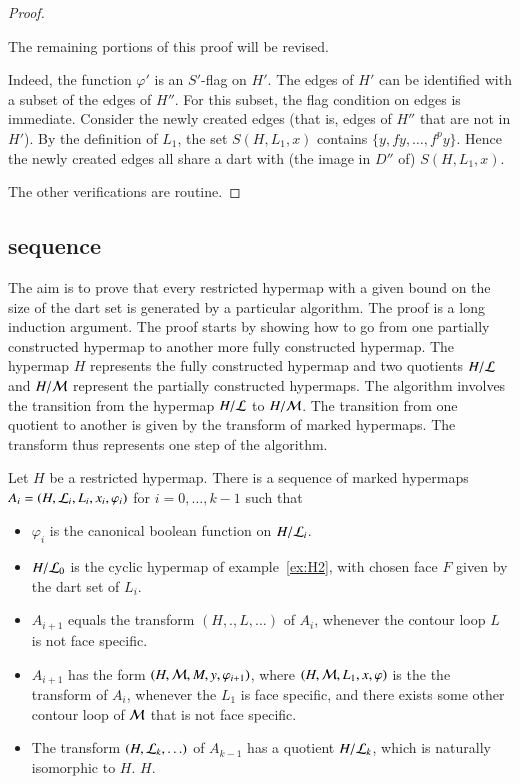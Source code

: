 \begin{proof}
\begin{note} %
The remaining portions of this proof will be revised.
\end{note}

 
Indeed, the function $\varphi'$ is an $S'$-flag on $H'$.  The edges of
$H'$ can be identified with a subset of the edges of $H''$.  For this
subset, the flag condition on edges is immediate.  Consider the
newly created edges  (that is, edges of $H''$ that are not in $H'$).
By the definition of $L_1$, the set  $S(H,L_1,x)$ contains $\{y,f y,\ldots,f^p y\}$.   
Hence the newly created edges all share a dart with
(the image in $D''$ of) $S(H,L_1,x)$. 


The other verifications are routine.
\end{proof}

\subsection{sequence}

The aim is to prove that every restricted hypermap with a given bound
on the size of the dart set is generated by a particular algorithm.
The proof is a long induction argument.  The proof starts by showing
how to go from one partially constructed hypermap to another more
fully constructed hypermap.  The hypermap $H$ represents the fully
constructed hypermap and two quotients $H/{\cal L}$ and $H/{\cal M}$
represent the partially constructed hypermaps.  The algorithm involves
the transition from the hypermap $H/{\cal L}$ to $H/{\cal M}$.  The
transition from one quotient to another is given by the transform of
marked hypermaps.  The transform thus represents one step of the
algorithm.  %

\begin{lemma}  Let $H$ be a restricted hypermap.  
There is a sequence of marked hypermaps
$A_i = (H,{\cal L}_i,L_i,x_i,\varphi_i)$ for $i=0,\ldots,k-1$ such that
\begin{itemize}
\item $\varphi_i$ is the canonical boolean function on $H/{\cal L}_i$.
\item $H/{\cal L}_0$ is the cyclic hypermap of example~\ref{ex:H2}, with
chosen face $F$ given by the dart set of $L_i$.
\item $A_{i+1}$ equals the transform $(H,.,L,\ldots)$ of
$A_i$, whenever the contour loop $L$ is not face specific.
\item $A_{i+1}$ has the form $(H,{\cal M},M,y,\varphi_{i+1})$, where $(H,{\cal M},L_1,x,\varphi)$ is
the the transform of $A_i$, whenever the $L_1$ is face specific, and there exists some other contour loop of ${\cal M}$ that is not face specific.
\item The transform $(H,{\cal L}_k,\ldots)$ of $A_{k-1}$ has a quotient $H/{\cal L}_k$,
which is naturally isomorphic to $H$.  
  $H$.
\end{itemize}
\end{lemma}


